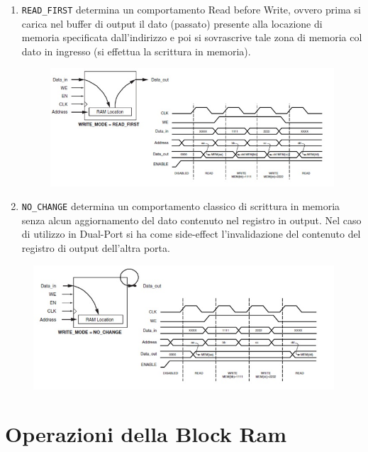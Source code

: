 \begin{itemize}
\begin{enumerate}
\item \texttt{READ\_FIRST} determina un comportamento Read before Write, ovvero prima si carica nel buffer di output il dato (passato) presente alla locazione di memoria specificata dall'indirizzo e poi si sovrascrive tale zona di memoria col dato in ingresso (si effettua la scrittura in memoria). 

\begin{figure}[!h]
\centering
\includegraphics[width=\textwidth]{img/blockRam/readFirst.jpg}
\label{fig:set_ass}
\end{figure}

\item \texttt{NO\_CHANGE} determina un comportamento classico di scrittura in memoria senza alcun aggiornamento del dato contenuto nel registro in output. Nel caso di utilizzo in Dual-Port si ha come side-effect l'invalidazione del contenuto del registro di output dell'altra porta.
\end{enumerate}

\begin{figure}[!h]
\centering
\includegraphics[width=\textwidth]{img/blockRam/noChange.jpg}
\label{fig:set_ass}
\end{figure}

\end{itemize}

\section{Operazioni della Block Ram}

